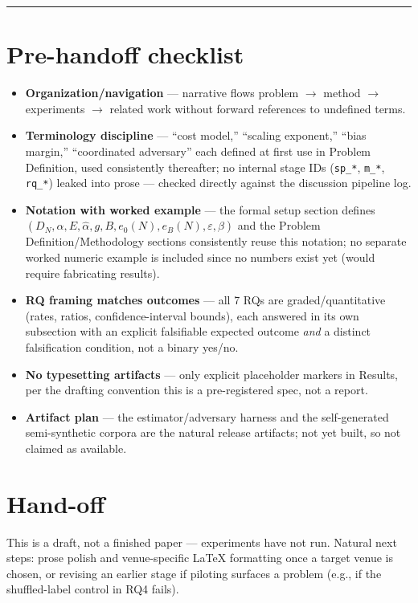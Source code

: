 \documentclass[11pt]{article}
\begin{document}
\vspace{1em}
\hrule
\vspace{1em}

\section*{Pre-handoff checklist}
\begin{itemize}[leftmargin=1.4em]
\item \textbf{Organization/navigation} --- narrative flows problem $\to$ method $\to$ experiments $\to$ related work without forward references to undefined terms.
\item \textbf{Terminology discipline} --- ``cost model,'' ``scaling exponent,'' ``bias margin,'' ``coordinated adversary'' each defined at first use in Problem Definition, used consistently thereafter; no internal stage IDs (\texttt{sp\_*}, \texttt{m\_*}, \texttt{rq\_*}) leaked into prose --- checked directly against the discussion pipeline log.
\item \textbf{Notation with worked example} --- the formal setup section defines $(D_N, \alpha, E, \hat\alpha, g, B, e_0(N), e_B(N), \varepsilon, \beta)$ and the Problem Definition/Methodology sections consistently reuse this notation; no separate worked numeric example is included since no numbers exist yet (would require fabricating results).
\item \textbf{RQ framing matches outcomes} --- all 7 RQs are graded/quantitative (rates, ratios, confidence-interval bounds), each answered in its own subsection with an explicit falsifiable expected outcome \emph{and} a distinct falsification condition, not a binary yes/no.
\item \textbf{No typesetting artifacts} --- only explicit placeholder markers in Results, per the drafting convention this is a pre-registered spec, not a report.
\item \textbf{Artifact plan} --- the estimator/adversary harness and the self-generated semi-synthetic corpora are the natural release artifacts; not yet built, so not claimed as available.
\end{itemize}

\section*{Hand-off}
This is a draft, not a finished paper --- experiments have not run. Natural next steps: prose polish and venue-specific LaTeX formatting once a target venue is chosen, or revising an earlier stage if piloting surfaces a problem (e.g., if the shuffled-label control in RQ4 fails).



\end{document}
